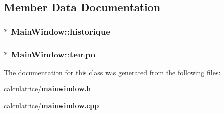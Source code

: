 \subsection{Member Data Documentation}
\subsubsection[{historique}]{$\ast$ Main\-Window\-::historique}\label{class_main_window_ab1b383c0450ed46281225db931bb1fb1}
\subsubsection[{tempo}]{$\ast$ Main\-Window\-::tempo}\label{class_main_window_af43164f6e0a0a75422a2f574a39699b6}


The documentation for this class was generated from the following files\-:\begin{DoxyCompactItemize}
\item 
calculatrice/{\bf mainwindow.\-h}\item 
calculatrice/{\bf mainwindow.\-cpp}\end{DoxyCompactItemize}
